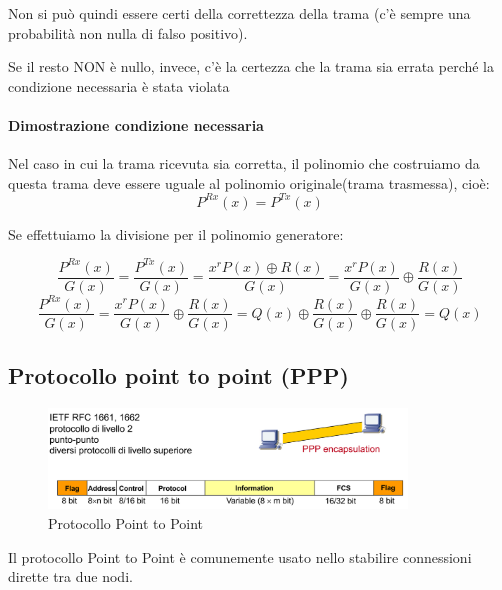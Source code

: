 Non si può quindi essere certi della correttezza della trama (c'è sempre una
probabilità non nulla di falso positivo).

Se il resto NON è nullo, invece, c'è la certezza che la trama sia errata
perché la condizione necessaria è stata violata

\paragraph{Dimostrazione condizione necessaria}
Nel caso in cui la trama ricevuta sia corretta, il polinomio che costruiamo da questa trama deve essere uguale al polinomio originale(trama trasmessa), cioè:
\begin{equation}
    P^{Rx}(x) = P^{Tx}(x)
\end{equation}

Se effettuiamo la divisione per il polinomio generatore:

    \begin{equation}
        \frac{P^{Rx}(x)}{G(x)} = \frac{P^{Tx}(x)}{G(x)} = \frac{x^rP(x) \oplus R(x)}{G(x)} = \frac{x^rP(x)}{G(x)} \oplus \frac{R(x)}{G(x)}
    \end{equation}
    \begin{equation}
        \frac{P^{Rx}(x)}{G(x)} = \frac{x^rP(x)}{G(x)} \oplus \frac{R(x)}{G(x)} = Q(x) \oplus \frac{R(x)}{G(x)} \oplus \frac{R(x)}{G(x)} = Q(x)
    \end{equation}

   

    \subsection{Protocollo point to point (PPP)}

    \begin{figure}[htbp]
        \centering
        \includegraphics[width=0.85\textwidth]{images/pointtopoint.png}
        \caption{Protocollo Point to Point}
        \label{fig:point-to-point}
    \end{figure}

Il protocollo Point to Point è comunemente usato nello stabilire connessioni dirette tra due nodi.

